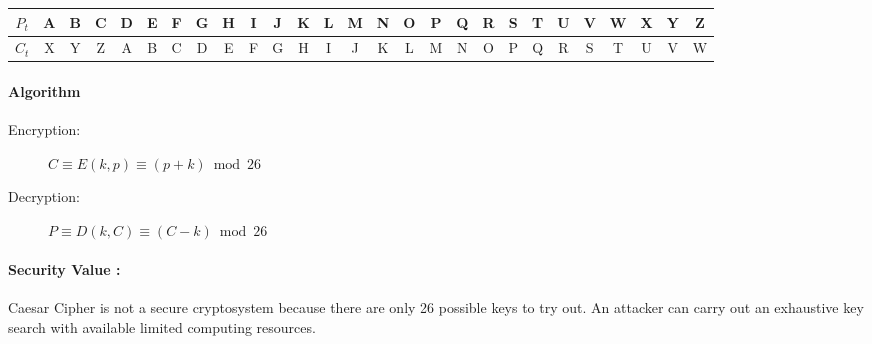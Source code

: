 \documentclass[british]{article}
\providecommand{\tabularnewline}{\\}
\begin{document}
\begin{center}
{\footnotesize{}}%
\begin{tabular}{|c|c|c|c|c|c|c|c|c|c|c|c|c|c|c|c|c|c|c|c|c|c|c|c|c|c|c|}
\hline 
{\footnotesize{}$P_t$} & {\footnotesize{}A} & {\footnotesize{}B} & {\footnotesize{}C} & {\footnotesize{}D} & {\footnotesize{}E} & {\footnotesize{}F} & {\footnotesize{}G} & {\footnotesize{}H} & {\footnotesize{}I} & {\footnotesize{}J} & {\footnotesize{}K} & {\footnotesize{}L} & {\footnotesize{}M} & {\footnotesize{}N} & {\footnotesize{}O} & {\footnotesize{}P} & {\footnotesize{}Q} & {\footnotesize{}R} & {\footnotesize{}S} & {\footnotesize{}T} & {\footnotesize{}U} & {\footnotesize{}V} & {\footnotesize{}W} & {\footnotesize{}X} & {\footnotesize{}Y} & {\footnotesize{}Z}\tabularnewline
\hline 
\hline 
{\footnotesize{}$C_t$} & {\footnotesize{}X} & {\footnotesize{}Y} & {\footnotesize{}Z} & {\footnotesize{}A} & {\footnotesize{}B} & {\footnotesize{}C} & {\footnotesize{}D} & {\footnotesize{}E} & {\footnotesize{}F} & {\footnotesize{}G} & {\footnotesize{}H} & {\footnotesize{}I} & {\footnotesize{}J} & {\footnotesize{}K} & {\footnotesize{}L} & {\footnotesize{}M} & {\footnotesize{}N} & {\footnotesize{}O} & {\footnotesize{}P} & {\footnotesize{}Q} & {\footnotesize{}R} & {\footnotesize{}S} & {\footnotesize{}T} & {\footnotesize{}U} & {\footnotesize{}V} & {\footnotesize{}W}\tabularnewline
\hline 
\end{tabular}{\footnotesize\par}
\par\end{center}

\paragraph{Algorithm}
\begin{description}
\item [{Encryption:}] $C \equiv E(k,p) \equiv (p+k) \bmod 26$
\item [{Decryption:}] $P \equiv D(k,C) \equiv (C-k) \bmod 26$
\end{description}

\paragraph{Security Value :}

Caesar Cipher is not a secure cryptosystem because there are only
26 possible keys to try out. An attacker can carry out an exhaustive
key search with available limited computing resources.
\end{document}
